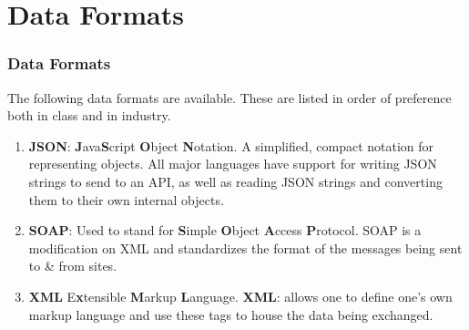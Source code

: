 \documentclass[aspectratio=169]{beamer}
\begin{document}
\section{Data Formats}
\begin{frame}
\frametitle{Data Formats}
The following data formats are available. These are listed in order of preference both in class and in industry.
\begin{enumerate}
	\item \textbf{JSON}: \textbf{J}ava\textbf{S}cript \textbf{O}bject \textbf{N}otation. A simplified, compact notation for representing objects. All major languages have support for writing JSON strings to send to an API, as well as reading JSON strings and converting them to their own internal objects.
	\item \textbf{SOAP}: Used to stand for \textbf{S}imple \textbf{O}bject \textbf{A}ccess \textbf{P}rotocol. SOAP is a modification on XML and standardizes the format of the messages being sent to \& from sites.
	\item \textbf{XML} E\textbf{x}tensible \textbf{M}arkup \textbf{L}anguage. \textbf{XML}: allows one to define one's own markup language and use these tags to house the data being exchanged.
\end{enumerate}
\end{frame}
\end{document}
